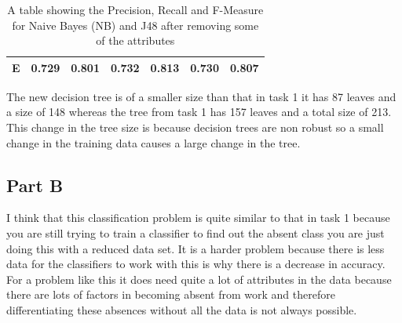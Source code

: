 \documentclass[10pt]{article}
\begin{document}
\begin{table}[]
\begin{tabular}{@{}|l|l|l|l|l|l|l|@{}}
E                                                        & 0.729                                                   & 0.801                                                    & 0.732                                                & 0.813                                                 & 0.730                                                   & 0.807                                                    \\ \bottomrule
\end{tabular}
\caption{ A  table showing the Precision, Recall and F-Measure for Naive Bayes (NB) and J48 after removing some of the attributes}
\label{tab:valuetabletask3}
\end{table}

The new decision tree is of a smaller size than that in task 1 it has 87 leaves and a size of 148 whereas the tree from task 1 has 157 leaves and a total size of 213. This change in the tree size is because decision trees are non robust so a small change in the training data causes a large change in the tree\cite[p.316]{JamesGareth2013Aits}.

\subsection*{Part B}

I think that this classification problem is quite similar to that in task 1 because you are still trying to train a classifier to find out the absent class you are just doing this with a reduced data set. It is a harder problem because there is less data for the classifiers to work with this is why there is a decrease in accuracy. For a problem like this it does need quite a lot of attributes in the data because there are lots of factors in becoming absent from work and therefore differentiating these absences without all the data is not always possible. 


\nocite{*}

\end{document}
